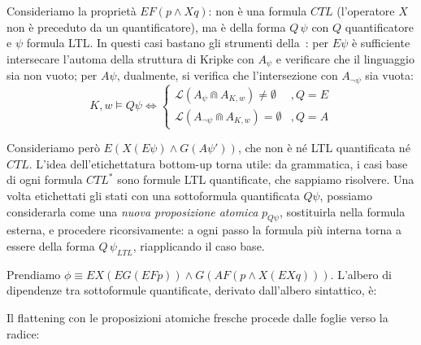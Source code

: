Consideriamo la proprietà \(E F(p\land X q)\): non è una formula \(CTL\) (l'operatore \(X\) non è preceduto da un quantificatore), ma è della forma \(Q\, \psi\) con \(Q\) quantificatore e \(\psi\) formula LTL\@. In questi casi bastano gli strumenti della~: per \(E\psi\) è sufficiente intersecare l'automa della struttura di Kripke con \(A_\psi\) e verificare che il linguaggio sia non vuoto; per \(A\psi\), dualmente, si verifica che l'intersezione con \(A_{\neg\psi}\) sia vuota:
\[K,w\models Q\psi \iff \begin{cases}
    \mathcal{L}(A_{\psi} \Cap A_{K,w}) \neq \emptyset       & ,Q = E \\
    \mathcal{L}(A_{\neg \psi} \Cap A_{K,w}) = \emptyset & ,Q = A
  \end{cases}\]

Consideriamo però \(E(X (E \psi) \land G (A \psi'))\), che non è né LTL quantificata né \(CTL\)\@. L'idea dell'etichettatura bottom-up torna utile: da grammatica, i casi base di ogni formula \(CTL^*\) sono formule LTL quantificate, che sappiamo risolvere. Una volta etichettati gli stati con una sottoformula quantificata \(Q\psi\), possiamo considerarla come una \emph{nuova proposizione atomica} \(p_{Q\psi}\), sostituirla nella formula esterna, e procedere ricorsivamente: a ogni passo la formula più interna torna a essere della forma \(Q\, \psi_{LTL}\), riapplicando il caso base.

\begin{example}{}
  Prendiamo \(\phi \equiv EX(EG(EFp)) \land G(AF(p\land X(EXq)))\). L'albero di dipendenze tra sottoformule quantificate, derivato dall'albero sintattico, è:

  \begin{center}
  \end{center}

  Il flattening con le proposizioni atomiche fresche procede dalle foglie verso la radice:

  \begin{center}
  \end{center}
\end{example}

